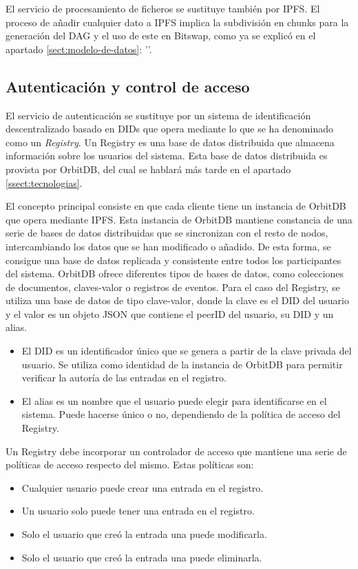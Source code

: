El servicio de procesamiento de ficheros se sustituye también por IPFS. El proceso de añadir cualquier dato a IPFS implica la subdivisión en chunks
para la generación del DAG y el uso de este en Bitswap, como ya se explicó en el apartado \ref{sect:modelo-de-datos}: ''.

\subsection{Autenticación y control de acceso}
El servicio de autenticación se sustituye por un sistema de identificación descentralizado basado en DIDs que opera mediante
lo que se ha denominado como un \textit{Registry}. Un Registry es una base de datos distribuida que almacena información sobre los usuarios del sistema.
Esta base de datos distribuida es provista por OrbitDB, del cual se hablará más tarde en el apartado \ref{ssect:tecnologias}.

El concepto principal consiste
en que cada cliente tiene un instancia de OrbitDB que opera mediante IPFS. Esta instancia de OrbitDB mantiene constancia de una serie de bases de datos distribuidas que se sincronizan
con el resto de nodos, intercambiando los datos que se han modificado o añadido. De esta forma, se consigue una base de datos replicada y consistente entre todos los participantes del
sistema. OrbitDB ofrece diferentes tipos de bases de datos, como colecciones de documentos, claves-valor o registros de eventos. Para el caso del Registry, se utiliza una base de
datos de tipo clave-valor, donde la clave es el DID del usuario y el valor es un objeto JSON que contiene el peerID del usuario, su DID y un alias.
\begin{itemize}[noitemsep,after=\vspace{-0.4\baselineskip}]
  \item El DID es un identificador único que se genera a partir de la clave privada del usuario.
        Se utiliza como identidad de la instancia de OrbitDB para permitir verificar la autoría de las entradas en el registro.
  \item El alias es un nombre que el usuario puede elegir para identificarse en el sistema. Puede hacerse único o no, dependiendo de la política de acceso del Registry.
\end{itemize}

Un Registry debe incorporar un controlador de acceso que mantiene una serie de políticas de acceso respecto del mismo.
Estas políticas son:
\begin{itemize}[noitemsep,after=\vspace{-0.4\baselineskip}]
  \item Cualquier usuario puede crear una entrada en el registro.
  \item Un usuario solo puede tener una entrada en el registro.
  \item Solo el usuario que creó la entrada una puede modificarla.
  \item Solo el usuario que creó la entrada una puede eliminarla.
\end{itemize}

